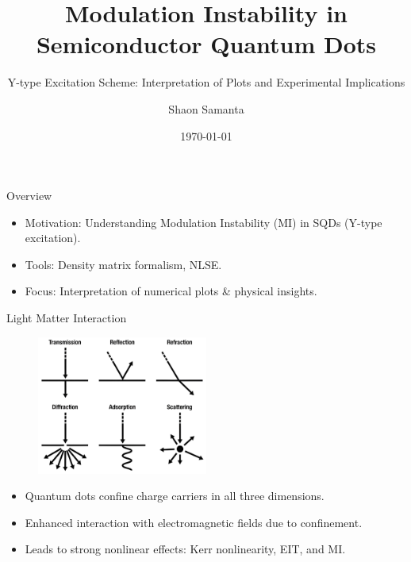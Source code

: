 \documentclass[12pt,aspectratio=1610]{beamer}
\title{Modulation Instability in Semiconductor Quantum Dots}
\subtitle{Y-type Excitation Scheme: Interpretation of Plots and Experimental Implications}
\author{Shaon Samanta}
\institute{Department of Physics}
\date{\today}
\begin{document}
\frame{\titlepage}

\begin{frame}{Overview}
  \vspace{-3pt}
  \begin{itemize}
    \item Motivation: Understanding Modulation Instability (MI) in SQDs (Y-type excitation).
    \item Tools: Density matrix formalism, NLSE\@.
    \item Focus: Interpretation of numerical plots \& physical insights.
  \end{itemize}
\end{frame}

\begin{frame}{Light Matter Interaction}
  \vspace{-20pt}
  \hspace*{55pt}
  \begin{figure}
    \includegraphics[width=0.5\textwidth]{Assets/Light Matter Interaction.jpeg}
  \end{figure}
  \begin{itemize}
    \item Quantum dots confine charge carriers in all three dimensions.
    \item Enhanced interaction with electromagnetic fields due to confinement.
    \item Leads to strong nonlinear effects: Kerr nonlinearity, EIT, and MI\@.
  \end{itemize}
\end{frame}
\end{document}
